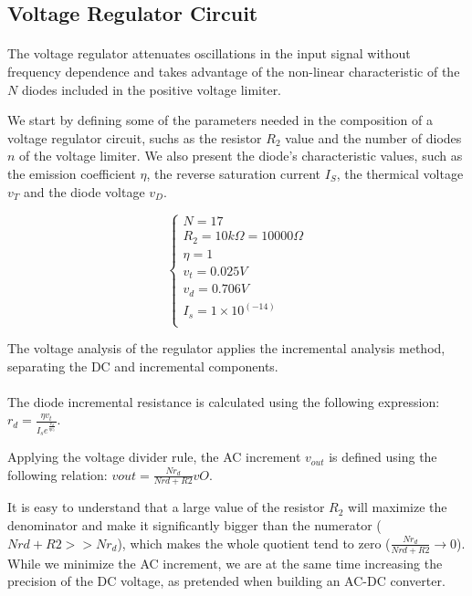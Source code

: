 \subsection{Voltage Regulator Circuit}
\label{subsec:regulator}

\paragraph{}
The voltage regulator attenuates oscillations in the input signal without frequency dependence and takes advantage of the non-linear characteristic of the $N$ diodes included in the positive voltage limiter. 

We start by defining some of the parameters needed in the composition of a voltage regulator circuit, suchs as the resistor $R_2$ value and the number of diodes $n$ of the voltage limiter. We also present the diode's characteristic values, such as the emission coefficient $\eta$, the reverse saturation current $I_S$, the thermical voltage $v_T$ and the diode voltage $v_D$.

\[
\left\{\begin{matrix}
N=17\\
R_2=10k\Omega=10 000\Omega\\
\eta=1\\
v_t=0.025 V\\
v_d=0.706 V\\
I_s=1\times10^(-14)\\
\end{matrix}\right.
\]


The voltage analysis of the regulator applies the incremental analysis method, separating the DC and incremental components.

\paragraph{}
The diode incremental resistance is calculated using the following expression: $r_d=\frac{\eta v_t}{I_s e^{\frac{v_d}{\eta v_t}}}$.

Applying the voltage divider rule, the AC increment $v_{out}$ is defined using the following relation: $vout=\frac{N r_d}{N rd+R2}vO$.

It is easy to understand that a large value of the resistor $R_2$ will maximize the denominator and make it significantly bigger than the numerator ($N rd+R2 >> N r_d$), which makes the whole quotient tend to zero ($\frac{N r_d}{N rd+R2} \longrightarrow 0$). While we minimize the AC increment, we are at the same time increasing the precision of the DC voltage, as pretended when building an AC-DC converter.

